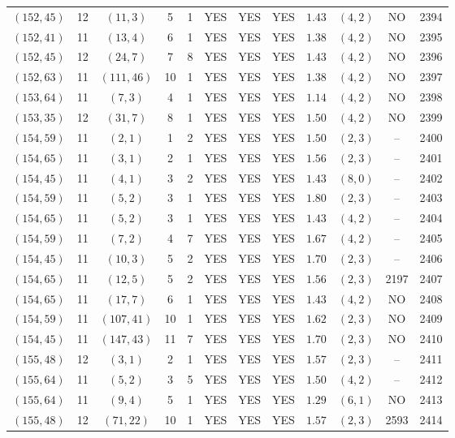 \begin{longtable}{|c|c|c|c|c|c|c|c|c|c|c|c|}
$(152,45)$ & 12 & $(11,3)$ & 5 & 1 & YES & YES & YES & $1.43$ & $(4,2)$ & NO & 2394\\
$(152,41)$ & 11 & $(13,4)$ & 6 & 1 & YES & YES & YES & $1.38$ & $(4,2)$ & NO & 2395\\
$(152,45)$ & 12 & $(24,7)$ & 7 & 8 & YES & YES & YES & $1.43$ & $(4,2)$ & NO & 2396\\
$(152,63)$ & 11 & $(111,46)$ & 10 & 1 & YES & YES & YES & $1.38$ & $(4,2)$ & NO & 2397\\
$(153,64)$ & 11 & $(7,3)$ & 4 & 1 & YES & YES & YES & $1.14$ & $(4,2)$ & NO & 2398\\
$(153,35)$ & 12 & $(31,7)$ & 8 & 1 & YES & YES & YES & $1.50$ & $(4,2)$ & NO & 2399\\
$(154,59)$ & 11 & $(2,1)$ & 1 & 2 & YES & YES & YES & $1.50$ & $(2,3)$ & -- & 2400\\
$(154,65)$ & 11 & $(3,1)$ & 2 & 1 & YES & YES & YES & $1.56$ & $(2,3)$ & -- & 2401\\
$(154,45)$ & 11 & $(4,1)$ & 3 & 2 & YES & YES & YES & $1.43$ & $(8,0)$ & -- & 2402\\
$(154,59)$ & 11 & $(5,2)$ & 3 & 1 & YES & YES & YES & $1.80$ & $(2,3)$ & -- & 2403\\
$(154,65)$ & 11 & $(5,2)$ & 3 & 1 & YES & YES & YES & $1.43$ & $(4,2)$ & -- & 2404\\
$(154,59)$ & 11 & $(7,2)$ & 4 & 7 & YES & YES & YES & $1.67$ & $(4,2)$ & -- & 2405\\
$(154,45)$ & 11 & $(10,3)$ & 5 & 2 & YES & YES & YES & $1.70$ & $(2,3)$ & -- & 2406\\
$(154,65)$ & 11 & $(12,5)$ & 5 & 2 & YES & YES & YES & $1.56$ & $(2,3)$ & 2197 & 2407\\
$(154,65)$ & 11 & $(17,7)$ & 6 & 1 & YES & YES & YES & $1.43$ & $(4,2)$ & NO & 2408\\
$(154,59)$ & 11 & $(107,41)$ & 10 & 1 & YES & YES & YES & $1.62$ & $(2,3)$ & NO & 2409\\
$(154,45)$ & 11 & $(147,43)$ & 11 & 7 & YES & YES & YES & $1.70$ & $(2,3)$ & NO & 2410\\
$(155,48)$ & 12 & $(3,1)$ & 2 & 1 & YES & YES & YES & $1.57$ & $(2,3)$ & -- & 2411\\
$(155,64)$ & 11 & $(5,2)$ & 3 & 5 & YES & YES & YES & $1.50$ & $(4,2)$ & -- & 2412\\
$(155,64)$ & 11 & $(9,4)$ & 5 & 1 & YES & YES & YES & $1.29$ & $(6,1)$ & NO & 2413\\
$(155,48)$ & 12 & $(71,22)$ & 10 & 1 & YES & YES & YES & $1.57$ & $(2,3)$ & 2593 & 2414\\

\end{longtable}
